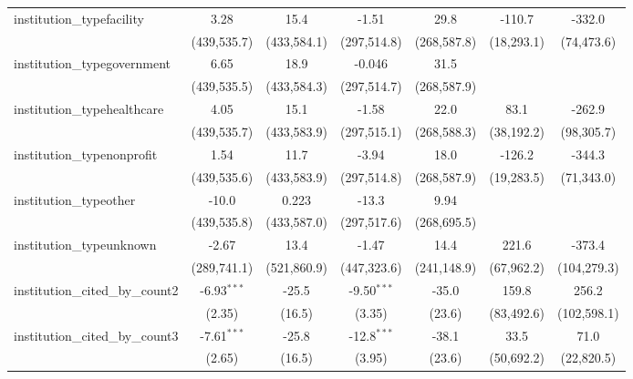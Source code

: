 \begin{tabular}{lcccccc}
   institution\_typefacility             & 3.28          & 15.4          & -1.51         & 29.8          & -110.7     & -332.0\\   
                                         & (439,535.7)   & (433,584.1)   & (297,514.8)   & (268,587.8)   & (18,293.1) & (74,473.6)\\   
   institution\_typegovernment           & 6.65          & 18.9          & -0.046        & 31.5          &            &   \\   
                                         & (439,535.5)   & (433,584.3)   & (297,514.7)   & (268,587.9)   &            &   \\   
   institution\_typehealthcare           & 4.05          & 15.1          & -1.58         & 22.0          & 83.1       & -262.9\\   
                                         & (439,535.7)   & (433,583.9)   & (297,515.1)   & (268,588.3)   & (38,192.2) & (98,305.7)\\   
   institution\_typenonprofit            & 1.54          & 11.7          & -3.94         & 18.0          & -126.2     & -344.3\\   
                                         & (439,535.6)   & (433,583.9)   & (297,514.8)   & (268,587.9)   & (19,283.5) & (71,343.0)\\   
   institution\_typeother                & -10.0         & 0.223         & -13.3         & 9.94          &            &   \\   
                                         & (439,535.8)   & (433,587.0)   & (297,517.6)   & (268,695.5)   &            &   \\   
   institution\_typeunknown              & -2.67         & 13.4          & -1.47         & 14.4          & 221.6      & -373.4\\   
                                         & (289,741.1)   & (521,860.9)   & (447,323.6)   & (241,148.9)   & (67,962.2) & (104,279.3)\\   
   institution\_cited\_by\_count2        & -6.93$^{***}$ & -25.5         & -9.50$^{***}$ & -35.0         & 159.8      & 256.2\\   
                                         & (2.35)        & (16.5)        & (3.35)        & (23.6)        & (83,492.6) & (102,598.1)\\   
   institution\_cited\_by\_count3        & -7.61$^{***}$ & -25.8         & -12.8$^{***}$ & -38.1         & 33.5       & 71.0\\   
                                         & (2.65)        & (16.5)        & (3.95)        & (23.6)        & (50,692.2) & (22,820.5)\\   

\end{tabular}

